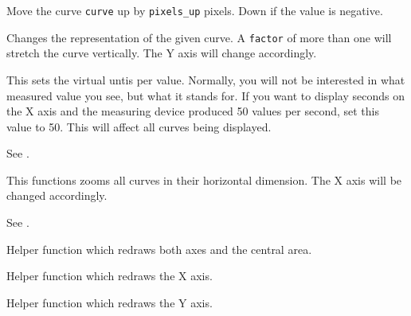 \label{wxplotwindowmove}


Move the curve {\tt curve} up by {\tt pixels\_up} pixels. Down if the
value is negative.

\label{wxplotwindowenlarge}


Changes the representation of the given curve. A {\tt factor} of more than
one will stretch the curve vertically. The Y axis will change accordingly.

\label{wxplotwindowsetunitspervalue}


This sets the virtual untis per value. Normally, you will not be interested in
what measured value you see, but what it stands for. If you want to display seconds
on the X axis and the measuring device produced 50 values per second, set this
value to 50. This will affect all curves being displayed.

\label{wxplotwindowgetunitspervalue}


See .

\label{wxplotwindowsetzoom}


This functions zooms all curves in their horizontal dimension. The X axis will
be changed accordingly.

\label{wxplotwindowgetzoom}


See .

\label{wxplotwindowredraweverything}


Helper function which redraws both axes and the central area.

\label{wxplotwindowredrawxaxis}


Helper function which redraws the X axis.

\label{wxplotwindowredrawyaxis}


Helper function which redraws the Y axis.

